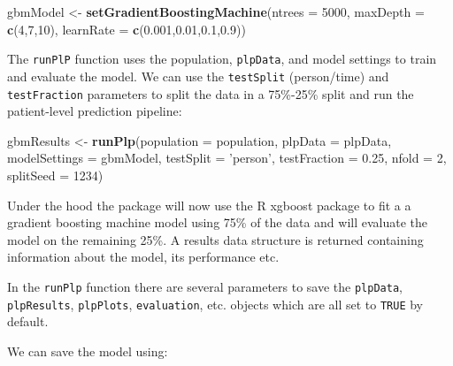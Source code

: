 \documentclass[11pt]{book}
\newenvironment{Shaded}{\begin{snugshade}}{\end{snugshade}}
\newcommand{\DataTypeTok}[1]{\textcolor[rgb]{0.13,0.29,0.53}{#1}}
\newcommand{\DecValTok}[1]{\textcolor[rgb]{0.00,0.00,0.81}{#1}}
\newcommand{\FloatTok}[1]{\textcolor[rgb]{0.00,0.00,0.81}{#1}}
\newcommand{\KeywordTok}[1]{\textcolor[rgb]{0.13,0.29,0.53}{\textbf{#1}}}
\newcommand{\NormalTok}[1]{#1}
\newcommand{\StringTok}[1]{\textcolor[rgb]{0.31,0.60,0.02}{#1}}
\theoremstyle{definition}
\theoremstyle{definition}
\theoremstyle{definition}
\theoremstyle{remark}
\begin{document}
\begin{Shaded}
\begin{Highlighting}[]
\NormalTok{gbmModel <-}\StringTok{ }\KeywordTok{setGradientBoostingMachine}\NormalTok{(}\DataTypeTok{ntrees =} \DecValTok{5000}\NormalTok{, }
                                       \DataTypeTok{maxDepth =} \KeywordTok{c}\NormalTok{(}\DecValTok{4}\NormalTok{,}\DecValTok{7}\NormalTok{,}\DecValTok{10}\NormalTok{), }
                                       \DataTypeTok{learnRate =} \KeywordTok{c}\NormalTok{(}\FloatTok{0.001}\NormalTok{,}\FloatTok{0.01}\NormalTok{,}\FloatTok{0.1}\NormalTok{,}\FloatTok{0.9}\NormalTok{))}
\end{Highlighting}
\end{Shaded}

The \texttt{runPlP} function uses the population, \texttt{plpData}, and model settings to train and evaluate the model. We can use the \texttt{testSplit} (person/time) and \texttt{testFraction} parameters to split the data in a 75\%-25\% split and run the patient-level prediction pipeline:

\begin{Shaded}
\begin{Highlighting}[]
\NormalTok{gbmResults <-}\StringTok{ }\KeywordTok{runPlp}\NormalTok{(}\DataTypeTok{population =}\NormalTok{ population, }
                     \DataTypeTok{plpData =}\NormalTok{ plpData, }
                     \DataTypeTok{modelSettings =}\NormalTok{ gbmModel, }
                     \DataTypeTok{testSplit =} \StringTok{'person'}\NormalTok{,}
                     \DataTypeTok{testFraction =} \FloatTok{0.25}\NormalTok{, }
                     \DataTypeTok{nfold =} \DecValTok{2}\NormalTok{, }
                     \DataTypeTok{splitSeed =} \DecValTok{1234}\NormalTok{)}
\end{Highlighting}
\end{Shaded}

Under the hood the package will now use the R xgboost package to fit a a gradient boosting machine model using 75\% of the data and will evaluate the model on the remaining 25\%. A results data structure is returned containing information about the model, its performance etc.

In the \texttt{runPlp} function there are several parameters to save the \texttt{plpData}, \texttt{plpResults}, \texttt{plpPlots}, \texttt{evaluation}, etc. objects which are all set to \texttt{TRUE} by default.

We can save the model using:
\end{document}
